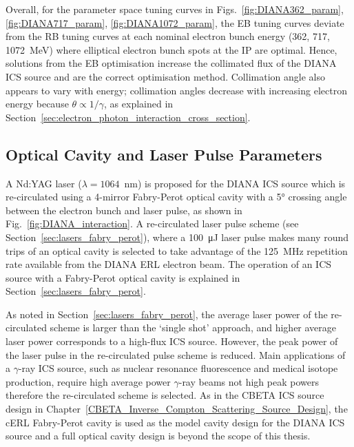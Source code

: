 \documentclass[../main.tex]{subfiles}
\begin{document}
Overall, for the parameter space tuning curves in Figs.~\ref{fig:DIANA362_param}, \ref{fig:DIANA717_param}, \ref{fig:DIANA1072_param}, the EB tuning curves deviate from the RB tuning curves at each nominal electron bunch energy (362, 717, 1072~\si{\mega\electronvolt}) where elliptical electron bunch spots at the IP are optimal. Hence, solutions from the EB optimisation increase the collimated flux of the DIANA ICS source and are the correct optimisation method. Collimation angle also appears to vary with energy; collimation angles decrease with increasing electron energy because $\theta \propto 1/\gamma$, as explained in Section~\ref{sec:electron_photon_interaction_cross_section}.  

\subsection{Optical Cavity and Laser Pulse Parameters}
\label{sec:DIANA_laser_fabry_perot}

A Nd:YAG laser ($\lambda = 1064$~\si{\nano\meter}) is proposed for the DIANA ICS source which is re-circulated using a 4-mirror Fabry-Perot optical cavity with a 5\si{\degree} crossing angle between the electron bunch and laser pulse, as shown in Fig.~\ref{fig:DIANA_interaction}. A re-circulated laser pulse scheme (see Section~\ref{sec:lasers_fabry_perot}), where a 100~\si{\micro\joule} laser pulse makes many round trips of an optical cavity is selected to take advantage of the 125~\si{\mega\hertz} repetition rate available from the DIANA ERL electron beam. The operation of an ICS source with a Fabry-Perot optical cavity is explained in Section~\ref{sec:lasers_fabry_perot}.

As noted in Section~\ref{sec:lasers_fabry_perot}, the average laser power of the re-circulated scheme is larger than the `single shot' approach, and higher average laser power corresponds to a high-flux ICS source. However, the peak power of the laser pulse in the re-circulated pulse scheme is reduced. Main applications of a $\gamma$-ray ICS source, such as nuclear resonance fluorescence and medical isotope production, require high average power $\gamma$-ray beams not high peak powers therefore the re-circulated scheme is selected. As in the CBETA ICS source design in Chapter~\ref{CBETA_Inverse_Compton_Scattering_Source_Design}, the cERL Fabry-Perot cavity \cite{akagi2016narrow} is used as the model cavity design for the DIANA ICS source and a full optical cavity design is beyond the scope of this thesis.
\end{document}
